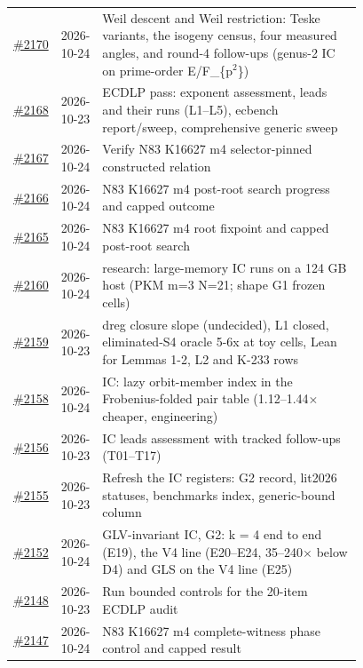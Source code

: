 {\begin{longtable}{@{}r l >{\raggedright\arraybackslash}p{0.78\linewidth}@{}}
\href{https://github.com/aburan28/crypto/pull/2170}{\#2170} & 2026-10-24 & Weil descent and Weil restriction: Teske variants, the isogeny census, four measured angles, and round-4 follow-ups (genus-2 IC on prime-order E/\allowbreak{}F\_\allowbreak{}\{p$^2$\})\\
\href{https://github.com/aburan28/crypto/pull/2168}{\#2168} & 2026-10-23 & ECDLP pass: exponent assessment, leads and their runs (L1--L5), ecbench report/\allowbreak{}sweep, comprehensive generic sweep\\
\href{https://github.com/aburan28/crypto/pull/2167}{\#2167} & 2026-10-24 & Verify N83 K16627 m4 selector-pinned constructed relation\\
\href{https://github.com/aburan28/crypto/pull/2166}{\#2166} & 2026-10-24 & N83 K16627 m4 post-root search progress and capped outcome\\
\href{https://github.com/aburan28/crypto/pull/2165}{\#2165} & 2026-10-24 & N83 K16627 m4 root fixpoint and capped post-root search\\
\href{https://github.com/aburan28/crypto/pull/2160}{\#2160} & 2026-10-24 & research: large-memory IC runs on a 124 GB host (PKM m=3 N=21; shape G1 frozen cells)\\
\href{https://github.com/aburan28/crypto/pull/2159}{\#2159} & 2026-10-23 & dreg closure slope (undecided), L1 closed, eliminated-S4 oracle 5-6x at toy cells, Lean for Lemmas 1-2, L2 and K-233 rows\\
\href{https://github.com/aburan28/crypto/pull/2158}{\#2158} & 2026-10-24 & IC: lazy orbit-member index in the Frobenius-folded pair table (1.12--1.44$\times$ cheaper, engineering)\\
\href{https://github.com/aburan28/crypto/pull/2156}{\#2156} & 2026-10-23 & IC leads assessment with tracked follow-ups (T01--T17)\\
\href{https://github.com/aburan28/crypto/pull/2155}{\#2155} & 2026-10-23 & Refresh the IC registers: G2 record, lit2026 statuses, benchmarks index, generic-bound column\\
\href{https://github.com/aburan28/crypto/pull/2152}{\#2152} & 2026-10-24 & GLV-invariant IC, G2: k = 4 end to end (E19), the V4 line (E20--E24, 35--240$\times$ below D4) and GLS on the V4 line (E25)\\
\href{https://github.com/aburan28/crypto/pull/2148}{\#2148} & 2026-10-23 & Run bounded controls for the 20-item ECDLP audit\\
\href{https://github.com/aburan28/crypto/pull/2147}{\#2147} & 2026-10-24 & N83 K16627 m4 complete-witness phase control and capped result\\

\end{longtable}}
